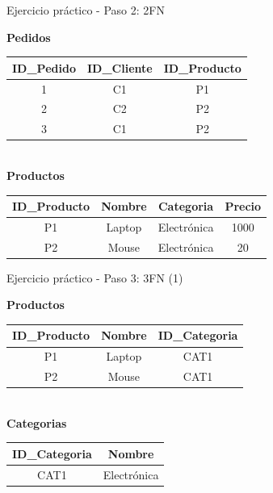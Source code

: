 \documentclass{beamer}
\begin{document}
\begin{frame}{Ejercicio práctico - Paso 2: 2FN}
    \small
    \begin{center}
    \textbf{Pedidos}\\[0.1cm]
    \begin{tabular}{ccc}
        \hline
        ID\_Pedido & ID\_Cliente & ID\_Producto \\
        \hline
        1 & C1 & P1 \\
        2 & C2 & P2 \\
        3 & C1 & P2 \\
        \hline
    \end{tabular}
    \vspace{0.6cm}
    \textbf{\\Productos}\\[0.1cm]
    \begin{tabular}{cccc}
        \hline
        ID\_Producto & Nombre & Categoria & Precio \\
        \hline
        P1 & Laptop & Electrónica & 1000 \\
        P2 & Mouse & Electrónica & 20 \\
        \hline
    \end{tabular}
    \end{center}
\end{frame}

\begin{frame}{Ejercicio práctico - Paso 3: 3FN (1)}
    \small
    \begin{center}
    \textbf{Productos}\\[0.1cm]
    \begin{tabular}{ccc}
        \hline
        ID\_Producto & Nombre & ID\_Categoria \\
        \hline
        P1 & Laptop & CAT1 \\
        P2 & Mouse & CAT1 \\
        \hline
    \end{tabular}
    \vspace{0.6cm}
    \textbf{\\Categorias}\\[0.1cm]
    \begin{tabular}{cc}
        \hline
        ID\_Categoria & Nombre \\
        \hline
        CAT1 & Electrónica \\
        \hline
    \end{tabular}
    \end{center}
\end{frame}
\end{document}
